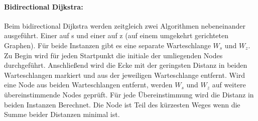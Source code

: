 \documentclass[12pt,a4paper]{article}
\begin{document}
\paragraph*{Bidirectional Dijkstra:}
Beim bidirectional Dijkstra werden zeitgleich zwei Algorithmen nebeneinander ausgeführt. Einer auf s und einer auf z (auf einem umgekehrt gerichteten Graphen). Für beide Instanzen gibt es eine separate Warteschlange $W_{s}$ und $W_{z}$. Zu Begin wird für jeden Startpunkt die initiale der umliegenden Nodes durchgeführt. Anschließend wird die Ecke mit der geringsten Distanz in beiden Warteschlangen markiert und aus der jeweiligen Warteschlange entfernt. Wird eine Node aus beiden Warteschlangen entfernt, werden $W_{s}$ und $W_{z}$ auf weitere übereinstimmende Nodes geprüft. Für jede Übereinstimmung wird die Distanz in beiden Instanzen Berechnet. Die Node ist Teil des kürzesten Weges wenn die Summe beider Distanzen minimal ist.
\end{document}
